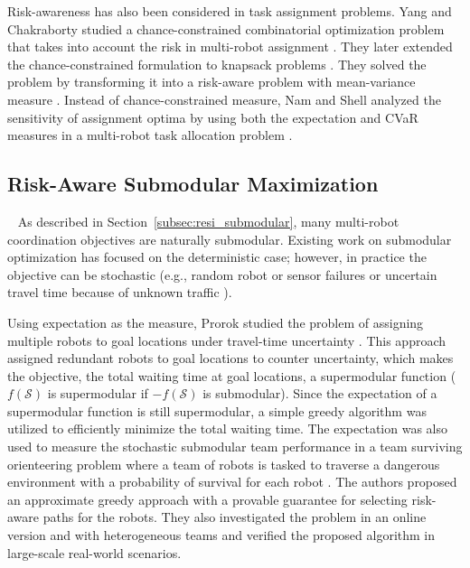 Risk-awareness has also been considered in task assignment problems. Yang and Chakraborty studied a chance-constrained combinatorial optimization problem that takes into account the risk in multi-robot assignment \cite{yang2017algorithm}. They later extended the chance-constrained formulation to knapsack problems \cite{yang2018algorithm}. They solved the problem by transforming it into a risk-aware problem with mean-variance measure \cite{park2018robust}. Instead of chance-constrained measure, Nam and Shell analyzed the sensitivity of assignment optima by using both the expectation and CVaR measures in a multi-robot task allocation problem \cite{nam2016analyzing}.    

\subsection{Risk-Aware Submodular Maximization}~\label{subsec:risk_submodular}
As described in Section~\ref{subsec:resi_submodular}, many multi-robot coordination objectives are naturally submodular. Existing work on submodular optimization has focused on the deterministic case; however, in practice the objective can be stochastic (e.g., random robot or sensor failures \cite{park2018robust,zhou2018approximation} or uncertain travel time because of unknown traffic \cite{zhou2018approximation,prorok2019redundant}). 

Using expectation as the measure, Prorok studied the problem of assigning multiple robots to goal locations under travel-time uncertainty \cite{prorok2019redundant}. This approach assigned redundant robots to goal locations to counter uncertainty, which makes the objective, the total waiting time at goal locations, a supermodular function ($f(\mathcal{S})$ is supermodular if $-f(\mathcal{S})$ is submodular). Since the expectation of a supermodular function is still supermodular, a simple greedy algorithm was utilized to efficiently minimize the total waiting time. The expectation was also used to measure the stochastic submodular team performance in a team surviving orienteering problem where a team of robots is tasked to traverse a dangerous environment with a probability of survival for each robot \cite{jorgensen2018team}. The authors proposed an approximate greedy approach with a provable guarantee for selecting risk-aware paths for the robots. They also investigated the problem in an online version and with heterogeneous teams and verified the proposed algorithm in large-scale real-world scenarios. 

